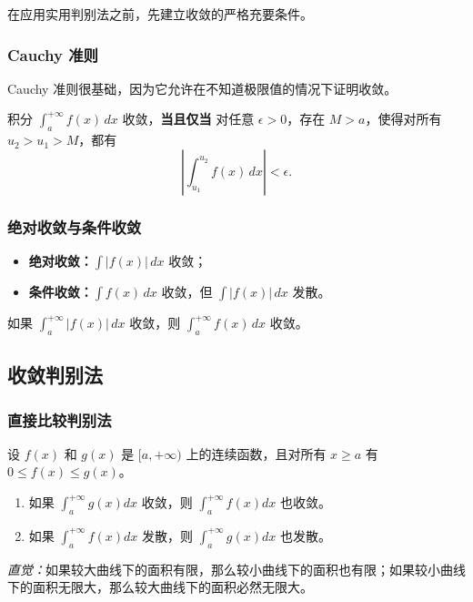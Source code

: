 在应用实用判别法之前，先建立收敛的严格充要条件。

\subsubsection{Cauchy 准则}
Cauchy 准则很基础，因为它允许在不知道极限值的情况下证明收敛。

\begin{theorem}
积分 $\int_a^{+\infty}f(x)\,dx$ 收敛，\textbf{当且仅当} 对任意 $\epsilon>0$，存在 $M>a$，使得对所有 $u_2>u_1>M$，都有
\[
\left|\int_{u_1}^{u_2}f(x)\,dx\right|<\epsilon.
\]
\end{theorem}

\subsubsection{绝对收敛与条件收敛}
\begin{itemize}
    \item \textbf{绝对收敛：}$\int |f(x)|\,dx$ 收敛；
    \item \textbf{条件收敛：}$\int f(x)\,dx$ 收敛，但 $\int |f(x)|\,dx$ 发散。
\end{itemize}
\begin{theorem}
如果 $\int_a^{+\infty}|f(x)|\,dx$ 收敛，则 $\int_a^{+\infty}f(x)\,dx$ 收敛。
\end{theorem}

\subsection{收敛判别法}

\subsubsection{直接比较判别法}
\begin{theorem}
设 $f(x)$ 和 $g(x)$ 是 $[a,+\infty)$ 上的连续函数，且对所有 $x\ge a$ 有 $0\le f(x)\le g(x)$。
\begin{enumerate}
    \item 如果 $\int_a^{+\infty}g(x)dx$ 收敛，则 $\int_a^{+\infty}f(x)dx$ 也收敛。
    \item 如果 $\int_a^{+\infty}f(x)dx$ 发散，则 $\int_a^{+\infty}g(x)dx$ 也发散。
\end{enumerate}
\end{theorem}
\textit{直觉：}如果较大曲线下的面积有限，那么较小曲线下的面积也有限；如果较小曲线下的面积无限大，那么较大曲线下的面积必然无限大。


